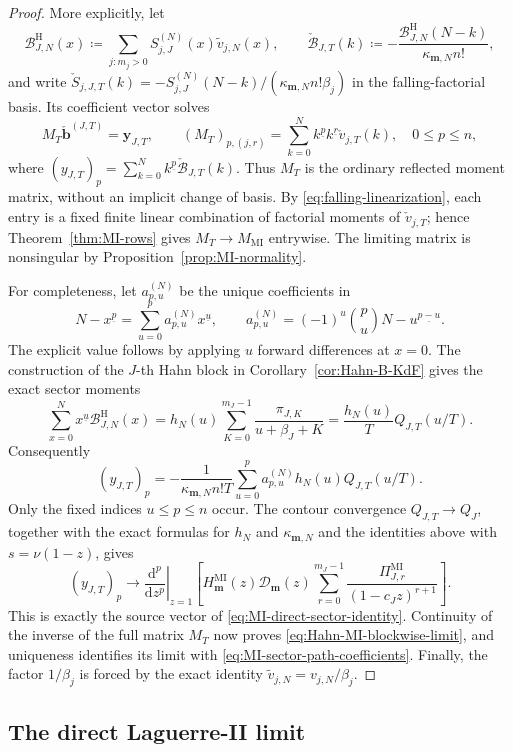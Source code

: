 \documentclass[10pt]{amsart}
\newcommand{\mm}{\boldsymbol m}
\newcommand{\fall}[2]{#1^{\underline{#2}}}
\theoremstyle{plain}
\theoremstyle{definition}
\theoremstyle{remark}
\begin{document}
\begin{proof}
More explicitly, let
\[
 \mathcal B_{J,N}^{\mathrm H}(x)
 \coloneq\sum_{j:m_j>0}S_{j,J}^{(N)}(x)\widetilde v_{j,N}(x),
 \qquad
 \check{\mathcal B}_{J,T}(k)
 \coloneq-\frac{\mathcal B_{J,N}^{\mathrm H}(N-k)}
 {\kappa_{\mm,N}n!},
\]
and write
\(\check S_{j,J,T}(k)=-S_{j,J}^{(N)}(N-k)/
(\kappa_{\mm,N}n!\beta_j)\) in the falling-factorial basis. Its
coefficient vector solves
\[
 M_T\check{\boldsymbol b}^{(J,T)}=\boldsymbol y_{J,T},
 \qquad
 (M_T)_{p,(j,r)}
 =\sum_{k=0}^N\fall{k}{p}\fall{k}{r}\check v_{j,T}(k),
 \quad 0\le p\le n,
\]
where
\((y_{J,T})_p=\sum_{k=0}^N\fall{k}{p}
\check{\mathcal B}_{J,T}(k)\). Thus \(M_T\) is the ordinary reflected
moment matrix, without an implicit change of basis. By
\eqref{eq:falling-linearization}, each entry is a fixed finite linear
combination of factorial moments of \(\check v_{j,T}\); hence
Theorem~\ref{thm:MI-rows} gives \(M_T\to M_{\mathrm{MI}}\) entrywise.
The limiting matrix is nonsingular by
Proposition~\ref{prop:MI-normality}.

For completeness, let \(a_{p,u}^{(N)}\) be the unique coefficients in
\[
 \fall{N-x}{p}=\sum_{u=0}^p a_{p,u}^{(N)}\fall{x}{u},
 \qquad
 a_{p,u}^{(N)}=(-1)^u\binom pu\fall{N-u}{p-u}.
\]
The explicit value follows by applying \(u\) forward differences at
\(x=0\).
The construction of the \(J\)-th Hahn block in
Corollary~\ref{cor:Hahn-B-KdF} gives the exact sector moments
\[
 \sum_{x=0}^N\fall{x}{u}\mathcal B_{J,N}^{\mathrm H}(x)
 =h_N(u)\sum_{K=0}^{m_J-1}
 \frac{\pi_{J,K}}{u+\beta_J+K}
 =\frac{h_N(u)}{T}Q_{J,T}(u/T).
\]
Consequently
\[
 (y_{J,T})_p=-\frac1{\kappa_{\mm,N}n!T}
 \sum_{u=0}^p a_{p,u}^{(N)}h_N(u)Q_{J,T}(u/T).
\]
Only the fixed indices \(u\le p\le n\) occur. The contour convergence
\(Q_{J,T}\to Q_J\), together with the exact formulas for \(h_N\) and
\(\kappa_{\mm,N}\) and the identities above with \(s=\nu(1-z)\), gives
\[
 (y_{J,T})_p\longrightarrow
 \left.\frac{\mathrm d^p}{\mathrm dz^p}\right|_{z=1}
 \left[H_{\boldsymbol m}^{\mathrm{MI}}(z)
 \mathcal D_{\boldsymbol m}(z)
 \sum_{r=0}^{m_J-1}
 \frac{\Pi_{J,r}^{\mathrm{MI}}}{(1-c_Jz)^{r+1}}\right].
\]
This is exactly the source vector of
\eqref{eq:MI-direct-sector-identity}. Continuity of the inverse of the
full matrix \(M_T\) now proves \eqref{eq:Hahn-MI-blockwise-limit}, and
uniqueness identifies its limit with
\eqref{eq:MI-sector-path-coefficients}. Finally, the factor
\(1/\beta_j\) is forced by the exact identity
\(\widetilde v_{j,N}=v_{j,N}/\beta_j\).
\end{proof}


\subsection{The direct Laguerre-II limit}
\end{document}

